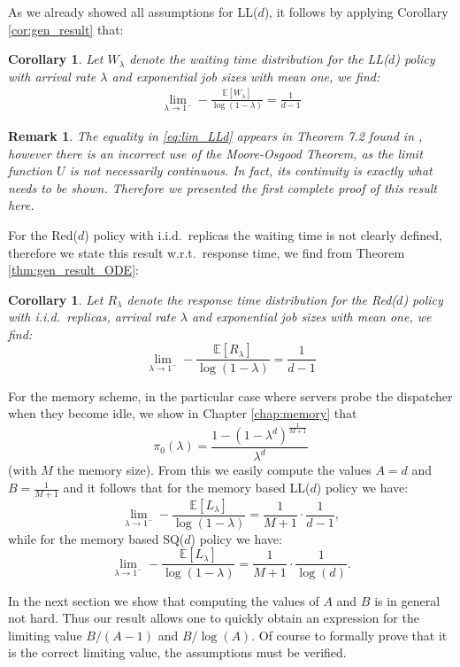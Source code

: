 \documentclass[12pt]{report}
\newcommand{\E}{\mathbb{E}}
\newtheorem{remark}{Remark}
\newtheorem{corollary}[theorem]{Corollary}
\begin{document}
As we already showed all assumptions for LL($d$), it follows by applying Corollary \ref{cor:gen_result} that:
\begin{corollary}\label{cor:LLd}
Let $W_\lambda$ denote the waiting time distribution for the LL($d$) policy with arrival rate $\lambda$ and exponential job sizes with mean one, we find:
\begin{align}\label{eq:lim_LLd}
\lim_{\lambda\rightarrow 1^-} - \frac{\E[W_\lambda]}{\log(1-\lambda)} = \frac{1}{d-1}
\end{align}
\end{corollary}
\begin{remark}
The equality in \eqref{eq:lim_LLd} appears in Theorem 7.2 found in \cite{hellemans2018power}, however there is an incorrect use of the Moore-Osgood Theorem, as the limit function $U$ is not necessarily continuous. In fact, its continuity is exactly what needs to be shown. Therefore we presented the \textit{first complete proof} of this result here.
\end{remark}

For the Red($d$) policy with i.i.d.~replicas the waiting time is not clearly defined, therefore we state this result w.r.t.~response time, we find from Theorem \ref{thm:gen_result_ODE}:
\begin{corollary}
Let $R_\lambda$ denote the response time distribution for the Red($d$) policy with i.i.d.~replicas, arrival rate $\lambda$ and exponential job sizes with mean one, we find:
$$
\lim_{\lambda \rightarrow 1^-} - \frac{\E[R_\lambda]}{\log(1-\lambda)} = \frac{1}{d-1}
$$
\end{corollary}

For the memory scheme, in the particular case where servers probe the dispatcher when they become idle, we show in Chapter \ref{chap:memory} that $$\pi_0(\lambda) = \frac{1- (1-\lambda^d)^{\frac{1}{M+1}}}{\lambda^d}$$
 (with $M$ the memory size). From this we easily compute the values $A = d$ and $B = \frac{1}{M+1}$ and it follows that for the memory based LL($d$) policy we have:
$$
\lim_{\lambda \rightarrow 1^-} - \frac{\E[L_\lambda]}{\log(1-\lambda)} = \frac{1}{M+1} \cdot \frac{1}{d-1},
$$
while for the memory based SQ($d$) policy we have:
$$
\lim_{\lambda \rightarrow 1^-} - \frac{\E[L_\lambda]}{\log(1-\lambda)} = \frac{1}{M+1} \cdot \frac{1}{\log(d)}.
$$

In the next section we show that computing the values of $A$ and $B$ is in general
not hard. Thus our result allows one to quickly obtain an expression for the
limiting value $B/(A-1)$ and $B/\log(A)$. Of course to formally prove that it is the correct limiting value,
the assumptions must be verified.
\end{document}

